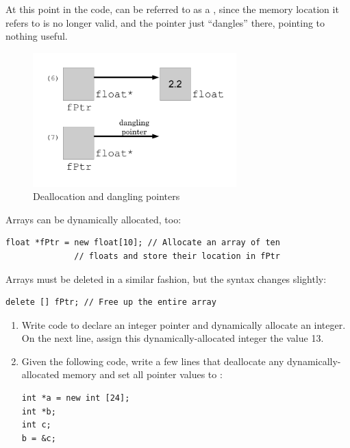 At this point in the code,  can be referred to as a , since the memory location it refers to is no longer valid, and the pointer just ``dangles'' there, pointing to nothing useful. 

\begin{figure}[tbh]
  \centering
  \includegraphics[width=0.7\textwidth]{diagrams/new_operator_diagram_3.pdf}
  \caption{Deallocation and dangling pointers} \label{fig:new_operator_diagram_3} 
\end{figure}
\noindent Arrays can be dynamically allocated, too:

\noindent\begin{minipage}{\linewidth}\begin{lstlisting}
float *fPtr = new float[10]; // Allocate an array of ten
              // floats and store their location in fPtr
\end{lstlisting}\end{minipage}

\noindent Arrays must be deleted in a similar fashion, but the syntax changes slightly:

\noindent\begin{minipage}{\linewidth}\begin{lstlisting}
delete [] fPtr; // Free up the entire array
\end{lstlisting}\end{minipage}



\begin{enumerate}
	\item Write code to declare an integer pointer and dynamically allocate an integer. On the next line, assign this dynamically-allocated integer the value 13.

  \item Given the following code, write a few lines that deallocate any dynamically-allocated memory and set all pointer values to :

\noindent\begin{minipage}{\linewidth}\begin{lstlisting}
int *a = new int [24];
int *b;
int c;
b = &c;
\end{lstlisting}\end{minipage}


\end{enumerate}

